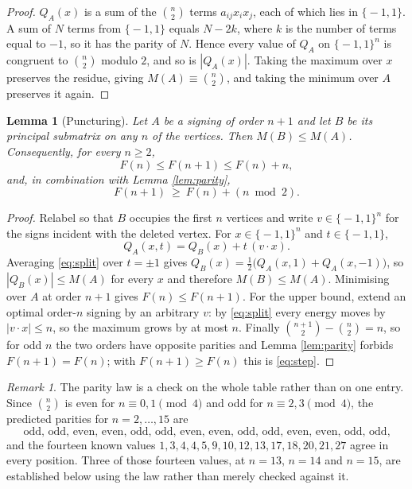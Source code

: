 \documentclass[11pt]{article}
\newcommand{\eps}{\{\!-1,1\!\}}
\newtheorem{lemma}[theorem]{Lemma}
\theoremstyle{remark}
\newtheorem{remark}[theorem]{Remark}
\begin{document}
\begin{proof}
$Q_A(x)$ is a sum of the $\binom n2$ terms $a_{ij}x_ix_j$, each of which lies
in $\eps$.  A sum of $N$ terms from $\eps$ equals $N-2k$, where $k$ is the
number of terms equal to $-1$, so it has the parity of $N$.  Hence every value
of $Q_A$ on $\eps^n$ is congruent to $\binom n2$ modulo $2$, and so is
$|Q_A(x)|$.  Taking the maximum over $x$ preserves the residue, giving
$M(A)\equiv\binom n2$, and taking the minimum over $A$ preserves it again.
\end{proof}

\begin{lemma}[Puncturing]\label{lem:punct}
Let $A$ be a signing of order $n+1$ and let $B$ be its principal submatrix on
any $n$ of the vertices.  Then $M(B)\le M(A)$.  Consequently, for every
$n\ge2$,
\[
 F(n)\le F(n+1)\le F(n)+n ,
\]
and, in combination with Lemma \ref{lem:parity},
\begin{equation}
 F(n+1)\ \ge\ F(n)+(n\bmod 2).                              \label{eq:step}
\end{equation}
\end{lemma}

\begin{proof}
Relabel so that $B$ occupies the first $n$ vertices and write $v\in\eps^n$ for
the signs incident with the deleted vertex.  For $x\in\eps^n$ and $t\in\eps$,
\begin{equation}
 Q_A(x,t)=Q_B(x)+t\,(v\cdot x).                              \label{eq:split}
\end{equation}
Averaging \eqref{eq:split} over $t=\pm1$ gives
$Q_B(x)=\tfrac12\bigl(Q_A(x,1)+Q_A(x,-1)\bigr)$, so $|Q_B(x)|\le M(A)$ for
every $x$ and therefore $M(B)\le M(A)$.  Minimising over $A$ at order $n+1$
gives $F(n)\le F(n+1)$.  For the upper bound, extend an optimal order-$n$
signing by an arbitrary $v$: by \eqref{eq:split} every energy moves by
$|v\cdot x|\le n$, so the maximum grows by at most $n$.  Finally
$\binom{n+1}2-\binom n2=n$, so for odd $n$ the two orders have opposite
parities and Lemma \ref{lem:parity} forbids $F(n+1)=F(n)$; with
$F(n+1)\ge F(n)$ this is \eqref{eq:step}.
\end{proof}

\begin{remark}\label{rem:parity-table}
The parity law is a check on the whole table rather than on one entry.  Since
$\binom n2$ is even for $n\equiv0,1\pmod4$ and odd for $n\equiv2,3\pmod4$, the
predicted parities for $n=2,\dots,15$ are
\[
 \text{odd, odd, even, even, odd, odd, even, even, odd, odd, even, even, odd,
 odd,}
\]
and the fourteen known values $1,3,4,4,5,9,10,12,13,17,18,20,21,27$ agree in
every position.  Three of those fourteen values, at $n=13$, $n=14$ and
$n=15$, are established below using the law rather than merely checked
against it.
\end{remark}
\end{document}

